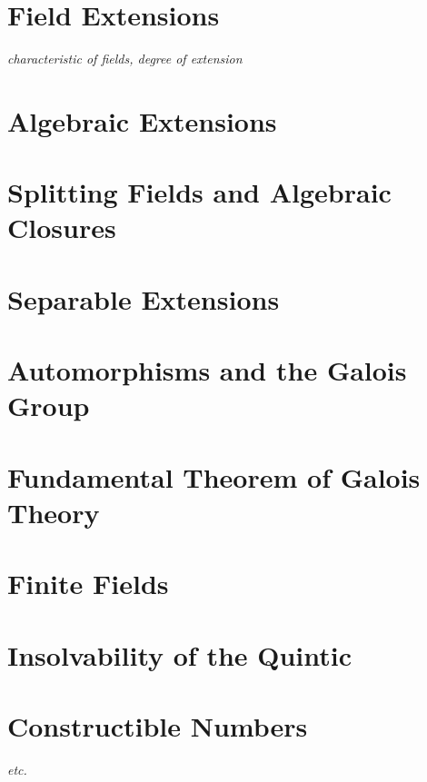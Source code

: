 \documentclass[../../../main.tex]{subfiles}
\begin{document}

\section{Field Extensions}
\textit{characteristic of fields, degree of extension}
\section{Algebraic Extensions}
\section{Splitting Fields and Algebraic Closures}
\section{Separable Extensions}
\section{Automorphisms and the Galois Group}
\section{Fundamental Theorem of Galois Theory}
\section{Finite Fields}
\section{Insolvability of the Quintic}
\section{Constructible Numbers}
\textit{etc.}

\printbibliography[
    heading=subbibintoc,
    title={References}
]
\end{document}
